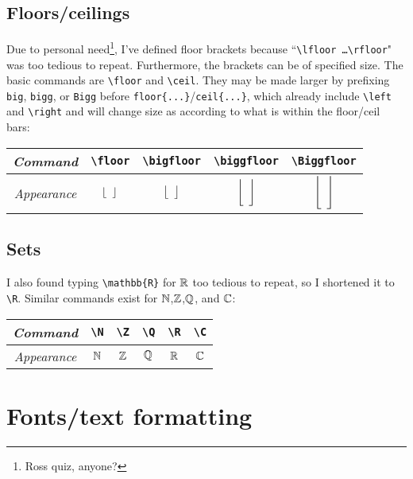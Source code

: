 \documentclass{article}
\begin{document}
\subsection{Floors/ceilings}
Due to personal need\footnote{Ross quiz, anyone?}, I've defined floor brackets because ``\texttt{\textbackslash lfloor \dots \textbackslash  rfloor}" was too tedious to repeat.  Furthermore, the brackets can be of specified size. The basic commands are \texttt{\textbackslash floor} and \texttt{\textbackslash ceil}. They may be made larger by prefixing \texttt{big}, \texttt{bigg}, or \texttt{Bigg} before \texttt{floor\{...\}}/\texttt{ceil\{...\}}, which already include \texttt{\textbackslash left} and \texttt{\textbackslash right} and will change size as according to what is within the floor/ceil bars:
\begin{center}
\begin{tabular}{c|c|c|c|c}
    \emph{Command} & \texttt{\textbackslash floor} & \texttt{\textbackslash bigfloor} & \texttt{\textbackslash biggfloor} & \texttt{\textbackslash Biggfloor}\\\hline
    \emph{Appearance} & $\left\lfloor \enskip\right\rfloor$ & $\bigl\lfloor \enskip\bigr\rfloor$ & $\biggl\lfloor \enskip\biggr\rfloor$ & $\Biggl\lfloor \enskip\Biggr\rfloor$ \\
\end{tabular}  
\end{center}

\subsection{Sets}

I also found typing \texttt{\textbackslash mathbb\{R\}} for $\mathbb{R}$ too tedious to repeat, so I shortened it to \texttt{\textbackslash R}. Similar commands exist for $\mathbb{N}$,$\mathbb{Z}$,$\mathbb{Q}$, and $\mathbb{C}$:
\begin{center}
\begin{tabular}{c|c|c|c|c|c}
\emph{Command}& \texttt{\textbackslash N} & \texttt{\textbackslash Z} & \texttt{\textbackslash Q} & \texttt{\textbackslash R} & \texttt{\textbackslash C}\\\hline
\emph{Appearance}& $\mathbb{N}$ & $\mathbb{Z}$ & $\mathbb{Q}$ & $\mathbb{R}$ & $\mathbb{C}$
\end{tabular}  
\end{center}

\section{Fonts/text formatting}
\end{document}
